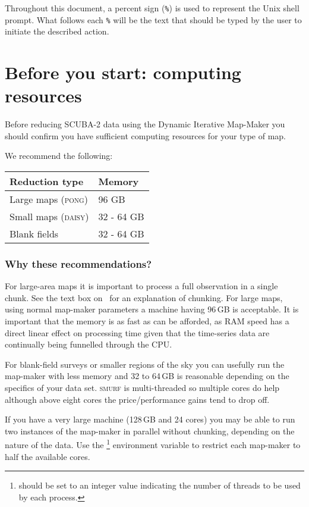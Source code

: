Throughout this document, a percent sign (\texttt{\%}) is used to
represent the Unix shell prompt. What follows each \texttt{\%} will be
the text that should be typed by the user to initiate the described action.

\section{ Before you start: computing resources}

Before reducing SCUBA-2 data using the Dynamic Iterative Map-Maker you should confirm you have
sufficient computing resources for your type of map.

We recommend the following:
\begin{table}[h!]
  \centering
  \begin{tabular}{ll}
    \hline
    \textbf{Reduction type} &\textbf{Memory} \\
    \hline
    Large maps (\textsc{pong})& 96 GB\\
    Small maps (\textsc{daisy})&32 - 64 GB\\
    Blank fields&32 - 64 GB\\
    \hline
  \end{tabular}
\end{table}

\subsubsection*{Why these recommendations?}

For large-area maps it is important to process a full observation in a
single chunk. See the text box on
\
for an explanation of chunking. For large maps, using normal map-maker
parameters a machine having 96\,GB is acceptable. It is important that
the memory is as fast as can be afforded, as RAM speed has a direct
linear effect on processing time given that the time-series data are
continually being funnelled through the CPU.

For blank-field surveys or smaller
regions of the sky you can usefully run the map-maker with less memory
and 32 to 64\,GB is reasonable depending on the specifics of your data
set. \textsc{smurf} is multi-threaded so multiple cores do help
although above eight cores the price/performance gains tend to drop
off.

If you have a very large machine (128\,GB and 24 cores) you may be able
to run two instances of the map-maker in parallel without chunking,
depending on the nature of the data. Use
the \footnote{ should be
set to an integer value indicating the number of threads to be used by
each process.} environment variable to restrict each map-maker to half
the available cores.

